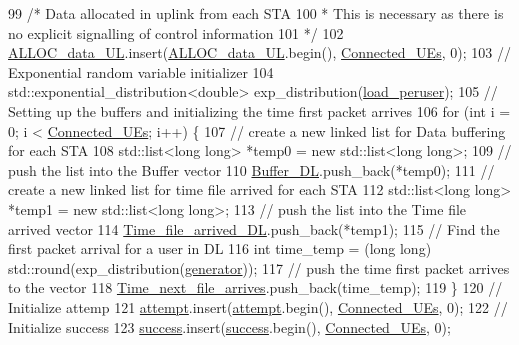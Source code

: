 \begin{DoxyCode}
99     \textcolor{comment}{/* Data allocated in uplink from each STA}
100 \textcolor{comment}{     * This is necessary as there is no explicit signalling of control information}
101 \textcolor{comment}{     */}
102     \hyperlink{classAP_ae5567916229fb09fbb83af3cfad5d71d}{ALLOC\_data\_UL}.insert(\hyperlink{classAP_ae5567916229fb09fbb83af3cfad5d71d}{ALLOC\_data\_UL}.begin(), 
      \hyperlink{classAP_af0d927a781e8776c18758508a6845c85}{Connected\_UEs}, 0);
103     \textcolor{comment}{// Exponential random variable initializer}
104     std::exponential\_distribution<double> exp\_distribution(\hyperlink{classAP_a3e8b289d2aa54fd8898e145fc605907b}{load\_peruser});
105     \textcolor{comment}{// Setting up the buffers and initializing the time first packet arrives}
106     \textcolor{keywordflow}{for} (\textcolor{keywordtype}{int} i = 0; i < \hyperlink{classAP_af0d927a781e8776c18758508a6845c85}{Connected\_UEs}; i++) \{
107         \textcolor{comment}{// create a new linked list for Data buffering for each STA}
108         std::list<long long> *temp0 = \textcolor{keyword}{new} std::list<long long>;
109         \textcolor{comment}{// push the list into the Buffer vector}
110         \hyperlink{classAP_af5970c0fdff7405ec2043c7fdd8cb427}{Buffer\_DL}.push\_back(*temp0);
111         \textcolor{comment}{// create a new linked list for time file arrived for each STA}
112         std::list<long long> *temp1 = \textcolor{keyword}{new} std::list<long long>;
113         \textcolor{comment}{// push the list into the Time file arrived vector}
114         \hyperlink{classAP_a9d46a009bcda14f024fb046cd7d1e816}{Time\_file\_arrived\_DL}.push\_back(*temp1);
115         \textcolor{comment}{// Find the first packet arrival for a user in DL}
116         \textcolor{keywordtype}{int} time\_temp = (\textcolor{keywordtype}{long} long) std::round(exp\_distribution(\hyperlink{classAP_adbc9c4c803b5a61b33b6199e1364fb94}{generator}));
117         \textcolor{comment}{// push the time first packet arrives to the vector}
118         \hyperlink{classAP_a21b0b1203a2a7701c66b6c5a803b0160}{Time\_next\_file\_arrives}.push\_back(time\_temp);
119     \}
120     \textcolor{comment}{// Initialize attemp}
121     \hyperlink{classAP_aa15c857fb5fb5d7688f1ee49d43a2aee}{attempt}.insert(\hyperlink{classAP_aa15c857fb5fb5d7688f1ee49d43a2aee}{attempt}.begin(), \hyperlink{classAP_af0d927a781e8776c18758508a6845c85}{Connected\_UEs}, 0);
122     \textcolor{comment}{// Initialize success}
123     \hyperlink{classAP_aa9d8130f487d3ba13dc6b22fe5e3868d}{success}.insert(\hyperlink{classAP_aa9d8130f487d3ba13dc6b22fe5e3868d}{success}.begin(), \hyperlink{classAP_af0d927a781e8776c18758508a6845c85}{Connected\_UEs}, 0);

\end{DoxyCode}
